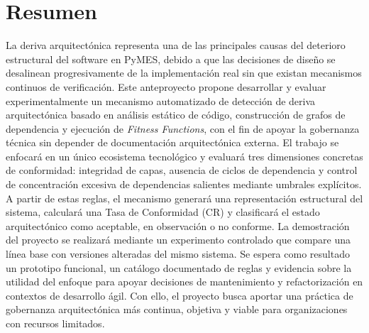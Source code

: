 \thispagestyle{empty}
\section*{Resumen}

La deriva arquitectónica representa una de las principales causas del deterioro estructural del software en PyMES, debido a que las decisiones de diseño se desalinean progresivamente de la implementación real sin que existan mecanismos continuos de verificación. Este anteproyecto propone desarrollar y evaluar experimentalmente un mecanismo automatizado de detección de deriva arquitectónica basado en análisis estático de código, construcción de grafos de dependencia y ejecución de \textit{Fitness Functions}, con el fin de apoyar la gobernanza técnica sin depender de documentación arquitectónica externa. El trabajo se enfocará en un único ecosistema tecnológico y evaluará tres dimensiones concretas de conformidad: integridad de capas, ausencia de ciclos de dependencia y control de concentración excesiva de dependencias salientes mediante umbrales explícitos. A partir de estas reglas, el mecanismo generará una representación estructural del sistema, calculará una Tasa de Conformidad (CR) y clasificará el estado arquitectónico como aceptable, en observación o no conforme. La demostración del proyecto se realizará mediante un experimento controlado que compare una línea base con versiones alteradas del mismo sistema. Se espera como resultado un prototipo funcional, un catálogo documentado de reglas y evidencia sobre la utilidad del enfoque para apoyar decisiones de mantenimiento y refactorización en contextos de desarrollo ágil. Con ello, el proyecto busca aportar una práctica de gobernanza arquitectónica más continua, objetiva y viable para organizaciones con recursos limitados.